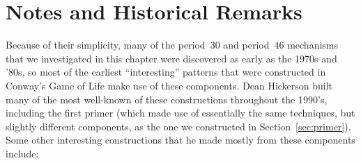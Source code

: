 \section*{Notes and Historical Remarks}
\label{sec:periodic_circuits_notes}

Because of their simplicity, many of the period~$30$ and period~$46$ mechanisms that we investigated in this chapter were discovered as early as the 1970s and '80s, so most of the earliest ``interesting'' patterns that were constructed in Conway's Game of Life make use of these components. Dean Hickerson built many of the most well-known of these constructions throughout the 1990's, including the first primer (which made use of essentially the same techniques, but slightly different components, as the one we constructed in Section~\ref{sec:primer}). Some other interesting constructions that he made mostly from these components include:\smallskip

